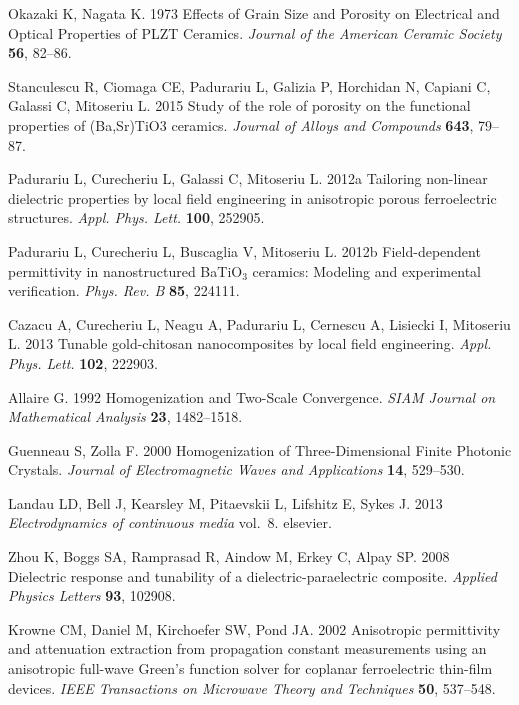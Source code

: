 \documentclass[%
 aip,
 amsmath,amssymb,
 reprint,%
]{revtex4-1}
\begin{document}
\begin{thebibliography}{99}
Okazaki K, Nagata K. 1973  Effects of {Grain} {Size} and {Porosity} on
  {Electrical} and {Optical} {Properties} of {PLZT} {Ceramics}. {\em Journal of
  the American Ceramic Society} \textbf{56}, 82--86.

Stanculescu R, Ciomaga CE, Padurariu L, Galizia P, Horchidan N, Capiani C,
  Galassi C, Mitoseriu L. 2015  Study of the role of porosity on the functional
  properties of ({Ba},{Sr}){TiO}3 ceramics. {\em Journal of Alloys and
  Compounds} \textbf{643}, 79--87.

Padurariu L, Curecheriu L, Galassi C, Mitoseriu L. 2012a  Tailoring non-linear
  dielectric properties by local field engineering in anisotropic porous
  ferroelectric structures. {\em Appl. Phys. Lett.} \textbf{100}, 252905.

Padurariu L, Curecheriu L, Buscaglia V, Mitoseriu L. 2012b  Field-dependent
  permittivity in nanostructured {BaTiO}$_3$ ceramics: {Modeling} and
  experimental verification. {\em Phys. Rev. B} \textbf{85}, 224111.

Cazacu A, Curecheriu L, Neagu A, Padurariu L, Cernescu A, Lisiecki I, Mitoseriu
  L. 2013  Tunable gold-chitosan nanocomposites by local field engineering.
  {\em Appl. Phys. Lett.} \textbf{102}, 222903.

Allaire G. 1992  Homogenization and {Two}-{Scale} {Convergence}. {\em SIAM
  Journal on Mathematical Analysis} \textbf{23}, 1482--1518.

Guenneau S, Zolla F. 2000  Homogenization of {Three}-{Dimensional} {Finite}
  {Photonic} {Crystals}. {\em Journal of Electromagnetic Waves and
  Applications} \textbf{14}, 529--530.

Landau LD, Bell J, Kearsley M, Pitaevskii L, Lifshitz E, Sykes J. 2013 {\em
  Electrodynamics of continuous media} vol.~8.
elsevier.

Zhou K, Boggs SA, Ramprasad R, Aindow M, Erkey C, Alpay SP. 2008  Dielectric
  response and tunability of a dielectric-paraelectric composite. {\em Applied
  Physics Letters} \textbf{93}, 102908.

Krowne CM, Daniel M, Kirchoefer SW, Pond JA. 2002  Anisotropic permittivity and
  attenuation extraction from propagation constant measurements using an
  anisotropic full-wave {Green}'s function solver for coplanar ferroelectric
  thin-film devices. {\em IEEE Transactions on Microwave Theory and Techniques}
  \textbf{50}, 537--548.


\end{thebibliography}
\end{document}
